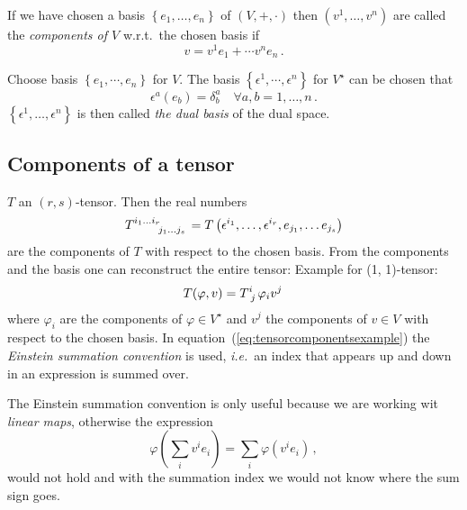 \documentclass[11pt, a4paper, twocolumn]{article} %
\begin{document}
If we have chosen a basis $\left\{ e_1, \ldots, e_n \right\}$ of $(V, +, \cdot)$ then
$(v^1, \ldots, v^n)$ are called the \textit{components of $V$} w.r.t.\ the chosen basis
if
\begin{equation}
    v = v^1 e_1 + \cdots v^n e_n\,.
\end{equation}

\begin{defn}
    Choose basis $\left\{ e_1, \cdots, e_n \right\}$ for $V$. 
    The basis $\left\{ \epsilon^1, \cdots, \epsilon^n \right\}$
    for $V^\star$ can be chosen that
    \begin{equation}
        \epsilon^a(e_b) = \delta^a_b\quad \forall a,b = 1,\ldots, n\,.
    \end{equation}
    $\left\{ \epsilon^1,\dots,\epsilon^n \right\}$ is then called \textit{the dual basis} of the dual
    space.
\end{defn}

\subsection{Components of a tensor}
$T$ an $(r,s)$-tensor. Then the real numbers
\begin{equation}
    T\indices{^{i_1\ldots i_r} _{j_1\ldots j_s}} = T\left( \epsilon^{i_1},\ldots, \epsilon^{i_r}, e_{j_1}, \ldots e_{j_s}\right)
\end{equation}
are the components of $T$ with respect to the chosen basis.
From the components and the basis one can reconstruct the entire tensor:
Example for (1, 1)-tensor:
\begin{equation}
    T(\varphi, v) = T\indices{^i _j} \varphi_i v^j\, \label{eq:tensorcomponentsexample}
\end{equation}
where $\varphi_i$ are the components of $\varphi\in V^\star$ and $v^j$ the components of $v\in V$ with respect to
the chosen basis. In equation~(\ref{eq:tensorcomponentsexample}) the \textit{Einstein summation convention} is used, \textit{i.e.}\ an index that appears up and down in an expression is summed over.

\begin{note}
    The Einstein summation convention is only useful because we are working wit \textit{linear maps},
    otherwise the expression
    \begin{equation}
        \varphi\left(\sum_i v^i e_i\right) = \sum_i \varphi(v^i e_i)\,, 
    \end{equation}
    would not hold and with the summation index we would not know where the sum sign goes.
\end{note}



\printbibliography[title={Bibliography}] %

\end{document}
